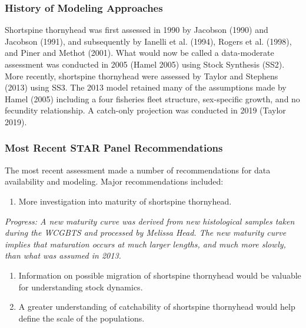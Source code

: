 \documentclass[11pt,
  english,
  letterpaper,
]{article}
\providecommand{\tightlist}{%
  \setlength{\itemsep}{0pt}\setlength{\parskip}{0pt}}
\providecommand{\tightlist}{%
  \setlength{\itemsep}{0pt}\setlength{\parskip}{0pt}}
\begin{document}
\hypertarget{history-of-modeling-approaches}{%
\subsubsection{History of Modeling Approaches}\label{history-of-modeling-approaches}}

Shortspine thornyhead was first assessed in 1990 by Jacobson (1990) and Jacobson (1991), and subsequently by Ianelli et al. (1994), Rogers et al. (1998), and Piner and Methot (2001). What would now be called a data-moderate assessment was conducted in 2005 (Hamel 2005) using Stock Synthesis (SS2). More recently, shortspine thornyhead were assessed by Taylor and Stephens (2013) using SS3. The 2013 model retained many of the assumptions made by Hamel (2005) including a four fisheries fleet structure, sex-specific growth, and no fecundity relationship. A catch-only projection was conducted in 2019 (Taylor 2019).

\hypertarget{most-recent-star-panel-recommendations}{%
\subsubsection{Most Recent STAR Panel Recommendations}\label{most-recent-star-panel-recommendations}}

The most recent assessment made a number of recommendations for data availability and modeling. Major recommendations included:

\begin{enumerate}
\def\labelenumi{\arabic{enumi}.}
\tightlist
\item
  More investigation into maturity of shortspine thornyhead.
\end{enumerate}

\emph{Progress: A new maturity curve was derived from new histological samples taken during the WCGBTS and processed by Melissa Head. The new maturity curve implies that maturation occurs at much larger lengths, and much more slowly, than what was assumed in 2013.}

\begin{enumerate}
\def\labelenumi{\arabic{enumi}.}
\setcounter{enumi}{1}
\tightlist
\item
  Information on possible migration of shortspine thornyhead would be valuable for understanding stock dynamics.
\item
  A greater understanding of catchability of shortspine thornyhead would help define the scale of the populations.
\end{enumerate}
\end{document}
